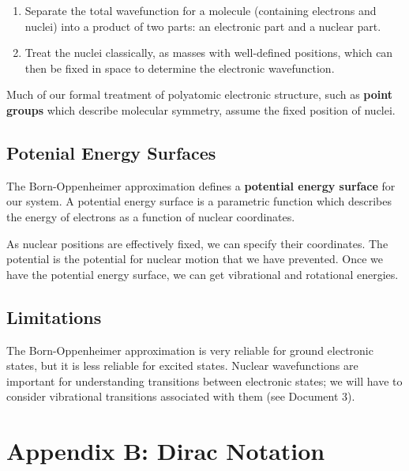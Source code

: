 \documentclass[a4paper]{tufte-handout}
\theoremstyle{definition}
\begin{document}
\begin{enumerate}
  \item Separate the total wavefunction for a molecule (containing electrons and nuclei) into a product of two parts: an electronic part and a nuclear part.
  \item Treat the nuclei classically, as masses with well-defined positions, which can then be fixed in space to determine the electronic wavefunction.

\end{enumerate}

Much of our formal treatment of polyatomic electronic structure, such as \textbf{point groups}
which describe molecular symmetry, assume the fixed position of nuclei.

\subsection{Potenial Energy Surfaces}

The Born-Oppenheimer approximation defines a \textbf{potential energy surface} for our system.
A potential energy surface is a parametric function which describes the energy of electrons
as a function of nuclear coordinates. 

As nuclear positions are effectively fixed, we can specify their coordinates. The potential is the potential for nuclear motion that we have prevented.
Once we have the potential energy surface, 
we can get vibrational and rotational energies. 

\subsection{Limitations}

The Born-Oppenheimer approximation is very reliable for ground electronic 
states, but it is less reliable for excited states. Nuclear wavefunctions
are important for understanding transitions between electronic states; we will have to consider vibrational transitions associated with them (see Document 3).

\section{Appendix B: Dirac Notation}
\end{document}
